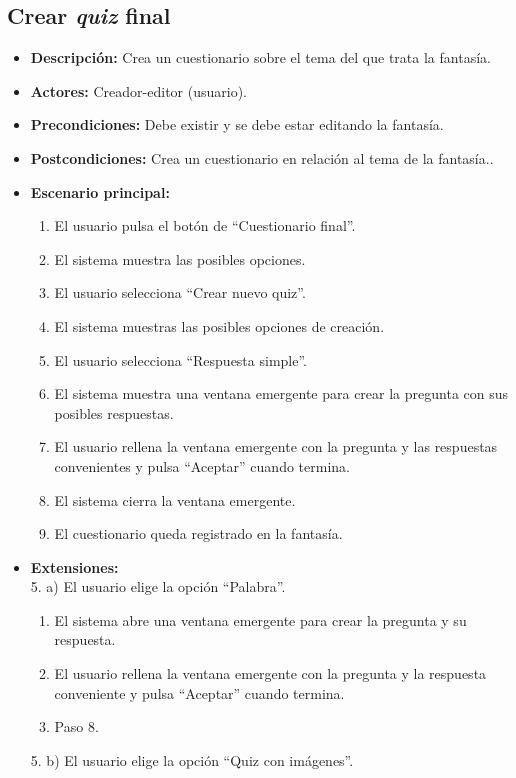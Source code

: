 \subsection{Crear \textit{quiz} final}
\begin{itemize}
	\item \textbf{Descripción:} Crea un cuestionario sobre el tema del que trata la fantasía.
	\item \textbf{Actores:} Creador-editor (usuario).
	\item \textbf{Precondiciones:} Debe existir y se debe estar editando la fantasía.
	\item \textbf{Postcondiciones:} Crea un cuestionario en relación al tema de la fantasía..
	\item \textbf{Escenario principal:}
	\begin{enumerate}
		\item El usuario pulsa el botón de ``Cuestionario final''.
		\item El sistema muestra las posibles opciones.
		\item El usuario selecciona ``Crear nuevo quiz''.
		\item El sistema muestras las posibles opciones de creación.
		\item El usuario selecciona ``Respuesta simple''.
		\item El sistema muestra una ventana emergente para crear la pregunta con sus posibles respuestas.
		\item El usuario rellena la ventana emergente con la pregunta y las respuestas convenientes y pulsa ``Aceptar'' cuando termina.
		\item El sistema cierra la ventana emergente.
		\item El cuestionario queda registrado en la fantasía.
	\end{enumerate}
	\item \textbf{Extensiones:} \\5. a) El usuario elige la opción ``Palabra''.
	\begin{enumerate}
		\item El sistema abre una ventana emergente para crear la pregunta y su respuesta.
		\item El usuario rellena la ventana emergente con la pregunta y la respuesta conveniente y pulsa ``Aceptar'' cuando termina.
		\item Paso 8.
	\end{enumerate}
	5. b) El usuario elige la opción ``Quiz con imágenes''.
	\begin{enumerate}

\end{enumerate}
\end{itemize}
